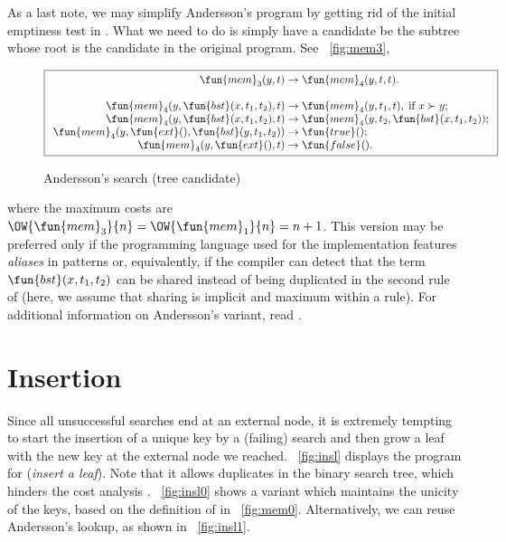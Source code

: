 As a last note, we may simplify Andersson's program by getting rid of
the initial emptiness test in . What we need to do is
simply have a candidate be the subtree whose root is the candidate in
the original program. See \fig~\vref{fig:mem3},
\begin{figure}
\begin{equation*}
\boxed{
\begin{array}{r@{\;}l@{\;}l}
  \fun{mem}_3(y,t) & \rightarrow & \fun{mem}_4(y,t,t).\\
  \\
  \fun{mem}_4(y,\fun{bst}(x,t_1,t_2),t) & \rightarrow &
  \fun{mem}_4(y,t_1,t),\; \text{if \(x \succ y\)};\\
\fun{mem}_4(y,\fun{bst}(x,t_1,t_2),t) & \rightarrow &
  \fun{mem}_4(y,t_2,\fun{bst}(x,t_1,t_2));\\
\fun{mem}_4(y,\fun{ext}(),\fun{bst}(y,t_1,t_2)) & \rightarrow & \fun{true}();\\
\fun{mem}_4(y,\fun{ext}(),t) & \rightarrow & \fun{false}().
\end{array}}
\end{equation*}
\caption{Andersson's search (tree candidate)}
\label{fig:mem3}
\end{figure}
where the maximum costs are \(\OW{\fun{mem}_3}{n} =
\OW{\fun{mem}_1}{n} = n + 1\).  This version may be preferred only if
the programming language used for the implementation features
\emph{aliases} in patterns or, equivalently, if
the compiler can detect that the term \(\fun{bst}(x,t_1,t_2)\) can be
shared instead of being duplicated in the second rule of
 (here, we assume that sharing is implicit and
maximum within a rule). For additional
information on Andersson's variant, read \cite{Spuler_1992}.


\section{Insertion}
\label{sec:bst:insertion}


Since all unsuccessful searches end at an external node, it is
extremely tempting to start the insertion of a unique key by a
(failing) search and then grow a leaf with the new key at the external
node we reached. \Fig~\vref{fig:insl} displays the program for
 (\emph{insert a leaf}). Note
that it allows duplicates in the binary search tree, which hinders the
cost analysis \citep{Burge_1976,ArchibaldClement_2006,Pasanen_2010}.
\Fig~\vref{fig:insl0} shows a variant which maintains the unicity of
the keys, based on the definition of
 in
\fig~\vref{fig:mem0}. Alternatively, we can reuse Andersson's lookup,
as shown in \fig~\vref{fig:insl1}.

